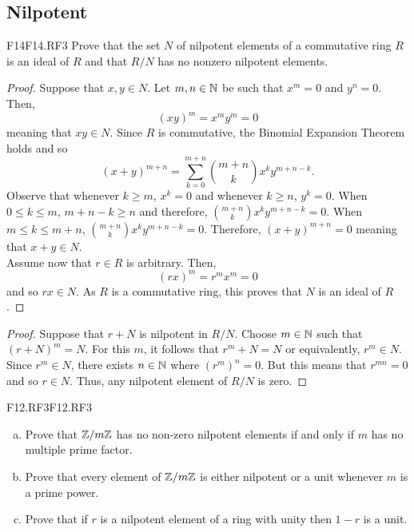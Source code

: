 \documentclass[../AlgebraQualSolutions.tex]{subfiles}
\begin{document}
\subsection{Nilpotent}

\begin{prob}{F14}{F14.RF3}
	Prove that the set $N$ of nilpotent elements of a commutative ring $R$ is an ideal of $R$ and that $R/N$ has no nonzero nilpotent elements.
\end{prob}

\begin{proof}
	Suppose that $x,y \in N$. Let $m,n \in \mathbb{N}$ be such that $x^m = 0$ and $y^n = 0$. Then,
		\[(xy)^m = x^my^m = 0 \]
	meaning that $xy \in N$. Since $R$ is commutative, the Binomial Expansion Theorem holds and so
		\[(x + y)^{m+n} = \sum_{k=0}^{m+n} {{m+n}\choose{k}}x^ky^{m+n - k}.\]
	Observe that whenever $k \geq m$, $x^k = 0$ and whenever $k \geq n$, $y^k = 0$. When $0 \leq k \leq m$, $m + n - k \geq n$ and therefore, ${{m+n}\choose{k}}x^ky^{m+n - k} = 0$. When $m \leq k \leq m+n$, ${{m+n}\choose{k}}x^ky^{m+n - k} = 0$. Therefore, $(x+y)^{m+n} = 0$ meaning that $x + y \in N$.\\

	Assume now that $r \in R$ is arbitrary. Then,
		\[(rx)^m = r^mx^m = 0\]
	and so $rx \in N$. As $R$ is a commutative ring, this proves that $N$ is an ideal of $R$.
\end{proof}

\begin{proof}
	Suppose that $r + N$ is nilpotent in $R/N$. Choose $m \in \mathbb{N}$ such that $(r + N)^m = N$. For this $m$, it follows that $r^m + N = N$ or equivalently, $r^m \in N$. Since $r^m \in N$, there exists $n \in \mathbb{N}$ where $(r^m)^n = 0$. But this means that $r^{mn} = 0$ and so $r \in N$. Thus, any nilpotent element of $R/N$ is zero.
\end{proof}

\begin{prob}{F12.RF3}{F12.RF3}
\begin{enumerate}[(a)]
\item Prove that $\mathbb{Z}/m\mathbb{Z}$ has no non-zero nilpotent elements if and only if $m$ has no multiple prime factor.
\item Prove that every element of $\mathbb{Z}/m\mathbb{Z}$ is either nilpotent or a unit whenever $m$ is a prime power.
\item Prove that if $r$ is a nilpotent element of a ring with unity then $1-r$ is a unit.
\end{enumerate}
\end{prob}
\end{document}
